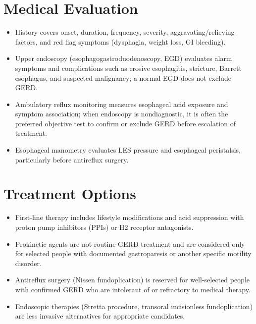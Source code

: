 \section*{Medical Evaluation}
\begin{itemize}
  \item History covers onset, duration, frequency, severity, aggravating/relieving factors, and red flag symptoms (dysphagia, weight loss, GI bleeding).
  \item Upper endoscopy (esophagogastroduodenoscopy, EGD) evaluates alarm symptoms and complications such as erosive esophagitis, stricture, Barrett esophagus, and suspected malignancy; a normal EGD does not exclude GERD.
  \item Ambulatory reflux monitoring measures esophageal acid exposure and symptom association; when endoscopy is nondiagnostic, it is often the preferred objective test to confirm or exclude GERD before escalation of treatment.
  \item Esophageal manometry evaluates LES pressure and esophageal peristalsis, particularly before antireflux surgery.
\end{itemize}

\section*{Treatment Options}
\begin{itemize}
  \item First-line therapy includes lifestyle modifications and acid suppression with proton pump inhibitors (PPIs) or H2 receptor antagonists.
  \item Prokinetic agents are not routine GERD treatment and are considered only for selected people with documented gastroparesis or another specific motility disorder.
  \item Antireflux surgery (Nissen fundoplication) is reserved for well-selected people with confirmed GERD who are intolerant of or refractory to medical therapy.
  \item Endoscopic therapies (Stretta procedure, transoral incisionless fundoplication) are less invasive alternatives for appropriate candidates.
\end{itemize}

